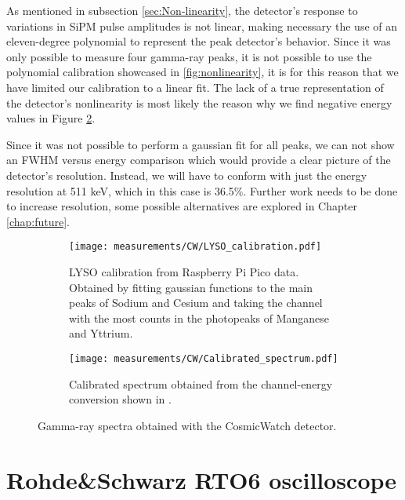 As mentioned in subsection \ref{sec:Non-linearity}, the detector's response to variations in SiPM pulse amplitudes is not linear, making necessary the use of an eleven-degree polynomial to represent the peak detector's behavior. Since it was only possible to measure four gamma-ray peaks, it is not possible to use the polynomial calibration showcased in \ref{fig:nonlinearity}, it is for this reason that we have limited our calibration to a linear fit. The lack of a true representation of the detector's nonlinearity is most likely the reason why we find negative energy values in Figure \ref{sfig:CW_joint_spectra}.

Since it was not possible to perform a gaussian fit for all peaks, we can not show an FWHM versus energy comparison which would provide a clear picture of the detector's resolution. Instead, we will have to conform with just the energy resolution at 511 keV, which in this case is 36.5$\%$. Further work needs to be done to increase resolution, some possible alternatives are explored in Chapter \ref{chap:future}.

\begin{figure}[H]
  \begin{subfigure}[t]{\textwidth}
    \centering
    \texttt{[image: measurements/CW/LYSO\_calibration.pdf]}
    \caption{\label{sfig:CW_LYSO_calibration}LYSO calibration from Raspberry Pi Pico data. Obtained by fitting gaussian functions to the main peaks of Sodium and Cesium and taking the channel with the most counts in the photopeaks of Manganese and Yttrium.}
  \end{subfigure}
  \medskip
  \begin{subfigure}[t]{\textwidth}
    \centering
    \texttt{[image: measurements/CW/Calibrated\_spectrum.pdf]}
    \caption{\label{sfig:CW_joint_spectra}Calibrated spectrum obtained from the channel-energy conversion shown in .}
  \end{subfigure}
  \caption{\label{fig:CW_calibration}Gamma-ray spectra obtained with the CosmicWatch detector.}
\end{figure}

\section{Rohde\&Schwarz RTO6 oscilloscope}\label{sec:RTO6}

